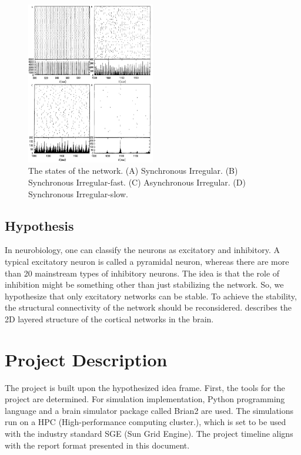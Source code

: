 \documentclass[a4paper,12pt]{article}
\begin{document}
\begin{figure}[htb!]
    \centering
    \includegraphics[width = 0.5\textwidth]{brunel.png}
    \caption{The states of the network. (A) Synchronous Irregular. (B) Synchronous Irregular-fast. (C) Asynchronous Irregular. (D) Synchronous Irregular-slow.}
    \label{brunel_fig}
\end{figure} 

\subsection{Hypothesis}

In neurobiology, one can classify the neurons as excitatory and inhibitory. A typical excitatory neuron is called a pyramidal neuron, whereas there are more than 20 mainstream types of inhibitory neurons. The idea is that the role of inhibition might be something other than just stabilizing the network. So, we hypothesize that only excitatory networks can be stable. To achieve the stability, the structural connectivity of the network should be reconsidered. \cite{2Dstructure} describes the 2D layered structure of the cortical networks in the brain. 

\section{Project Description}
The project is built upon the hypothesized idea frame. First, the tools for the project are determined. For simulation implementation, Python programming language and a brain simulator package called Brian2 \cite{brian2} are used. The simulations run on a HPC (High-performance computing cluster.), which is set to be used with the industry standard SGE (Sun Grid Engine). The project timeline aligns with the report format presented in this document. 
\end{document}
